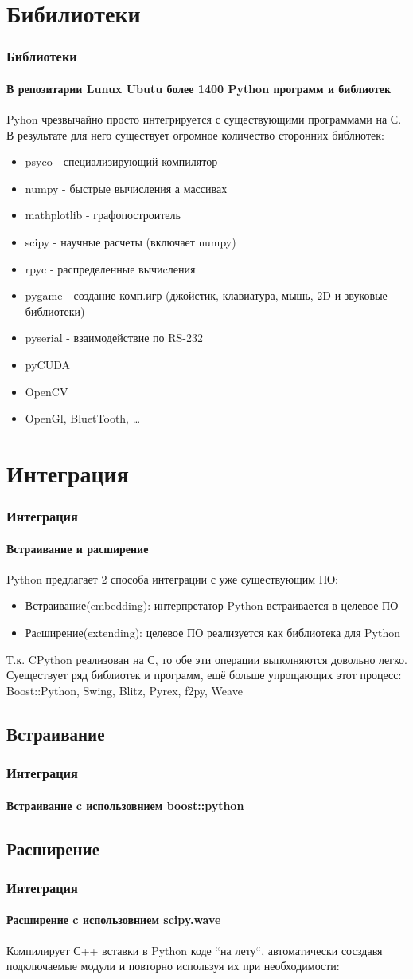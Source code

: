 \documentclass{beamer}
\begin{document}
\section{Бибилиотеки}
\begin{frame}
\frametitle{Библиотеки}
\framesubtitle{В репозитарии Lunux Ubutu более 1400 Python программ и библиотек}
Pyhon чрезвычайно просто интегрируется с существующими программами на С. В результате для него существует огромное количество
сторонних библиотек:
\begin{itemize}
    \item<1> psyco - специализирующий компилятор 
	\item<1> numpy - быстрые вычисления а массивах
	\item<1> mathplotlib - графопостроитель
	\item<1> scipy - научные расчеты (включает numpy) 
	\item<1> rpyc - распределенные вычиcления
	\item<1> pygame - создание комп.игр (джойстик, клавиатура, мышь, 2D и звуковые библиотеки)
	\item<1> pyserial - взаимодействие по RS-232
	\item<1> pyCUDA
	\item<1> OpenCV
	\item<1> OpenGl, BluetTooth, \ldots 
\end{itemize}

\end{frame}

\section{Интеграция}
\begin{frame}
\frametitle{Интеграция}
\framesubtitle{Встраивание и расширение}
Python предлагает 2 способа интеграции с уже существующим ПО:
\begin{itemize}
    \item<1> Встраивание(embedding): интерпретатор Python встраивается в целевое ПО 
	\item<1> Раcширение(extending): целевое ПО реализуется как библиотека для Python 
\end{itemize}
Т.к. CPython реализован на С, то обе эти операции выполняются довольно легко.
Суеществует ряд библиотек и программ, ещё больше упрощающих этот процесс: Boost::Python, Swing, Blitz, Pyrex, f2py, Weave
\end{frame}

\subsection{Встраивание}
\begin{frame}
\frametitle{Интеграция}
\framesubtitle{Встраивание c использовнием boost::python}
\lstset{language=C}

\lstset{language=Python}
\end{frame}

\subsection{Расширение}
\begin{frame}
\frametitle{Интеграция}
\framesubtitle{Расширение c использовнием scipy.wave}
Компилирует С++ вставки в Python коде ``на лету``, автоматически сосздавя подключаемые модули и повторно используя их при
необходимости:

\end{frame}
\end{document}
